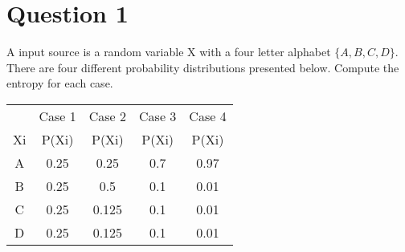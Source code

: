 

\section*{Question 1}
\begin{frame}
A input source is a random variable X with a four letter alphabet $\{A,B,C,D\}$.
There are four different probability distributions presented below. 
Compute the entropy for each case.

\begin{tabular}{|c|c|c|c|c|}
\hline
	&	Case 1	&	Case 2	&	Case 3	&	Case 4	\\	
Xi	&	P(Xi)	&	P(Xi)	&	P(Xi)	&	P(Xi)	\\	\hline
A	&	0.25	&	0.25	&	0.7	&	0.97	\\	\hline
B	&	0.25	&	0.5	&	0.1	&	0.01	\\	\hline
C	&	0.25	&	0.125	&	0.1	&	0.01	\\	\hline
D	&	0.25	&	0.125	&	0.1	&	0.01	\\	\hline
\end{tabular} 

\end{frame}
